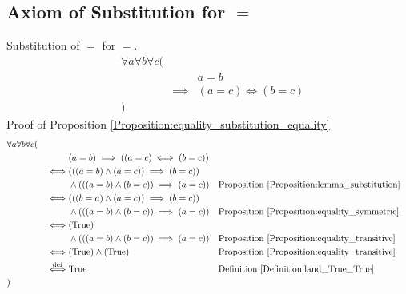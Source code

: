 \subsection{Axiom of Substitution for $=$}
\begin{prop}
\label{Proposition:equality_substitution_equality}
Substitution of $=$ for $=$.
\begin{align*}
& \forall a \forall b \forall c ( \\
& & & a = b \\
& & \implies & (a = c) \iff (b = c) \\
& )
\end{align*}
Proof of Proposition \ref{Proposition:equality_substitution_equality}
\begin{align*}
& \forall a \forall b \forall c ( \\
& & & (a = b) \implies ((a = c) \iff (b = c)) \\
& & \iff & (((a = b) \land (a = c)) \implies (b = c)) \\
& & & \land (((a = b) \land (b = c)) \implies (a = c))
& & \text{Proposition \ref{Proposition:lemma_substitution}} \\
& & \iff & (((b = a) \land (a = c)) \implies (b = c)) \\
& & & \land (((a = b) \land (b = c)) \implies (a = c))
& & \text{Proposition \ref{Proposition:equality_symmetric}} \\
& & \iff & (\text{True}) \\
& & & \land (((a = b) \land (b = c)) \implies (a = c))
& & \text{Proposition \ref{Proposition:equality_transitive}} \\
& & \iff & (\text{True}) \land (\text{True})
& & \text{Proposition \ref{Proposition:equality_transitive}} \\
& & \overset{\operatorname{def}}{\iff} & \text{True}
& & \text{Definition \ref{Definition:land_True_True}} \\
& )
\end{align*}
\end{prop}

